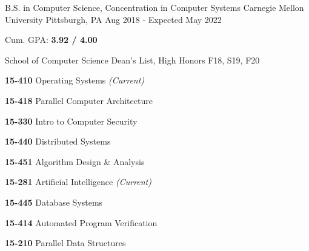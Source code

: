 
\begin{cventries}

  \cventry
    {B.S. in Computer Science, Concentration in Computer Systems} %
    {Carnegie Mellon University} %
    {Pittsburgh, PA} %
    {Aug 2018 - Expected May 2022} %
    {
      \begin{cvitems} %
      \item {Cum. GPA: \textbf{3.92 / 4.00}}
        \item {School of Computer Science Dean's List, High Honors F18, S19, F20}
        \item {}
            \setlength\multicolsep{0pt}
            \begin{multicols}{3}
              \item[] {\textbf{15-410} Operating Systems \textit{\color{awesome}(Current)}}
              \item[] {\textbf{15-418} Parallel Computer Architecture}
              \item[] {\textbf{15-330} Intro to Computer Security}
              \item[] {\textbf{15-440} Distributed Systems}
              \item[] {\textbf{15-451} Algorithm Design \& Analysis}
              \item[] {\textbf{15-281} Artificial Intelligence \textit{\color{awesome}(Current)}}
              \item[] {\textbf{15-445} Database Systems}
              \item[] {\textbf{15-414} Automated Program Verification}
              \item[] {\textbf{15-210} Parallel Data Structures}
            \end{multicols}
      \end{cvitems}
    }

\end{cventries}
